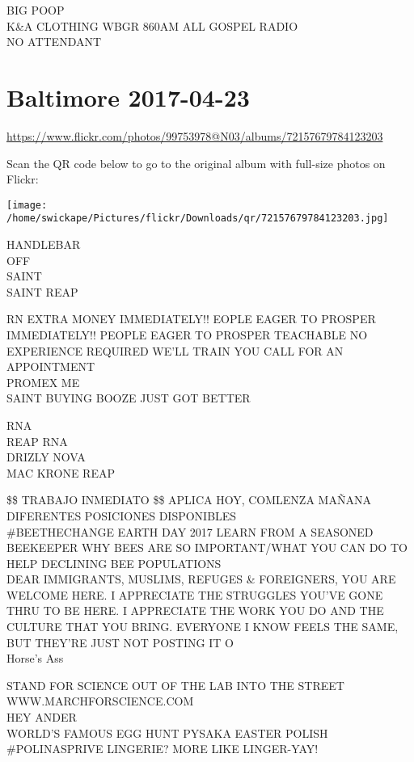\documentclass[10pt,letterpaper]{article}
\begin{document}
BIG POOP\\
K\&A CLOTHING WBGR 860AM ALL GOSPEL RADIO\\
NO ATTENDANT
\pagebreak

\section*{Baltimore 2017-04-23}

\url{https://www.flickr.com/photos/99753978@N03/albums/72157679784123203}

Scan the QR code below to go to the original album with full-size photos on Flickr:

\texttt{[image: /home/swickape/Pictures/flickr/Downloads/qr/72157679784123203.jpg]}
\pagebreak

HANDLEBAR\\
OFF\\
SAINT\\
SAINT REAP

RN EXTRA MONEY IMMEDIATELY!! EOPLE EAGER TO PROSPER\\
IMMEDIATELY!!  PEOPLE EAGER TO PROSPER TEACHABLE NO EXPERIENCE REQUIRED WE'LL TRAIN YOU CALL FOR AN APPOINTMENT\\
PROMEX ME\\
SAINT BUYING BOOZE JUST GOT BETTER

RNA\\
REAP RNA\\
DRIZLY NOVA\\
MAC KRONE REAP

\$\$ TRABAJO INMEDIATO \$\$ APLICA HOY, COMLENZA MAÑANA DIFERENTES POSICIONES DISPONIBLES\\
\#BEETHECHANGE EARTH DAY 2017 LEARN FROM A SEASONED BEEKEEPER WHY BEES ARE SO IMPORTANT/WHAT YOU CAN DO TO HELP DECLINING BEE POPULATIONS\\
DEAR IMMIGRANTS, MUSLIMS, REFUGES \& FOREIGNERS, YOU ARE WELCOME HERE.  I APPRECIATE THE STRUGGLES YOU'VE GONE THRU TO BE HERE.  I APPRECIATE THE WORK YOU DO AND THE CULTURE THAT YOU BRING.  EVERYONE I KNOW FEELS THE SAME, BUT THEY'RE JUST NOT POSTING IT O\\
Horse's Ass

STAND FOR SCIENCE OUT OF THE LAB INTO THE STREET WWW.MARCHFORSCIENCE.COM\\
HEY ANDER\\
WORLD'S FAMOUS EGG HUNT PYSAKA EASTER POLISH\\
\#POLINASPRIVE LINGERIE? MORE LIKE LINGER{-}YAY!
\end{document}
